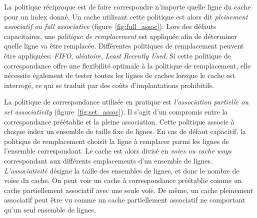 La politique réciproque est de faire correspondre n'importe quelle ligne du cache pour un index donné.
Un cache utilisant cette politique est alors dit \emph{pleinement associatif ou full associative} (figure~\ref{fig:full_assoc}).
Lors des défauts capacitaires, une \emph{politique de remplacement} est appliquée afin de déterminer quelle ligne va être remplacée.
Différentes politiques de remplacement peuvent être appliquées: \emph{FIFO}, \emph{aléatoire}, \emph{Least Recently Used}.
Si cette politique de correspondance offre une flexibilité optimale à la politique de remplacement, elle nécessite également de tester toutes les lignes de caches lorsque le cache est interrogé, ce qui se traduit par des coûts d'implantations prohibitifs.

La politique de correspondance utilisée en pratique est \emph{l'association partielle ou set associativity} (figure~\ref{fig:set_assoc}).
Il s'agit d'un compromis entre la correspondance préétablie et la pleine association.
Cette politique associe à chaque index un ensemble de taille fixe de lignes.
En cas de défaut capacitif, la politique de remplacement choisit la ligne à remplacer parmi les lignes de l'ensemble correspondant.
Le cache est alors divisé en \emph{voies ou cache ways} correspondant aux différents emplacements d'un ensemble de lignes.
\emph{L'associativité} désigne la taille des ensembles de lignes, et donc le nombre de voies du cache.
On peut voir un cache à correspondance préétablie comme un cache partiellement associatif avec une seule voie.
De même, un cache pleinement associatif peut être vu comme un cache partiellement associatif ne comportant qu'un seul ensemble de lignes. 

